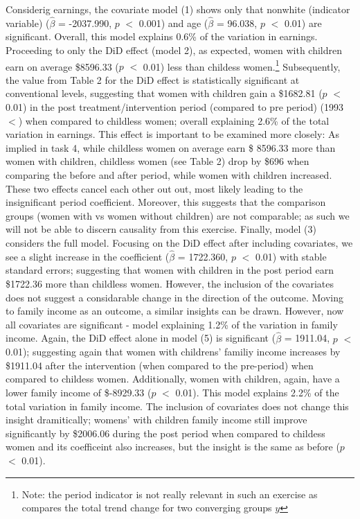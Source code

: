 \documentclass[a4paper]{article}
\begin{document}
\indent Considerig earnings, the covariate model (1) shows only that nonwhite (indicator variable) ($\hat{\beta}$ = -2037.990, $p$ $<$ 0.001) and age ($\hat{\beta}$ = 96.038, $p$ $<$ 0.01) are significant. Overall, this model explains 0.6\% of the variation in earnings. Proceeding to only the DiD effect (model 2), as expected, women with children earn on average \$8596.33 ($p$ $<$ 0.01) less than childess women.\footnote{Note: the period indicator is not really relevant in such an exercise as compares the total trend change for two converging groups $y$} Subsequently, the value from Table 2 for the DiD effect is statistically significant at conventional levels, suggesting that women with children gain a \$1682.81 ($p$ $<$ 0.01) in the post treatment/intervention period (compared to pre period) (1993 $<$) when compared to childless women; overall explaining 2.6\% of the total variation in earnings. This effect is important to be examined more closely: As implied in task 4, while childless women on average earn \$ 8596.33 more than women with children, childless women (see Table 2) drop by \$696 when comparing the before and after period, while women with children increased. These two effects cancel each other out out, most likely leading to the insignificant period coefficient. Moreover, this suggests that the comparison groups (women with vs women without children) are not comparable; as such we will not be able to discern causality from this exercise. Finally, model (3) considers the full model. Focusing on the DiD effect after including covariates, we see a slight increase in the coefficient ($\hat{\beta}$ = 1722.360, $p$ $<$ 0.01) with stable standard errors; suggesting that women with children in the post period earn \$1722.36 more than childless women. However, the inclusion of the covariates does not suggest a considarable change in the direction of the outcome. 
\indent Moving to family income as an outcome, a similar insights can be drawn. However, now all covariates are significant - model explaining 1.2\% of the variation in family income. Again, the DiD effect alone in model (5) is significant ($\hat{\beta}$ = 1911.04, $p$ $<$ 0.01); suggesting again that women with childrens' familiy income increases by \$1911.04 after the intervention (when compared to the pre-period) when compared to childess women. Additionally, women with children, again, have a lower family income of \$-8929.33 ($p$ $<$ 0.01). This model explains 2.2\% of the total variation in family income. The inclusion of covariates does not change this insight dramitically; womens' with children family income still improve significantly by \$2006.06 during the post period when compared to childess women and its coefficeint also increases, but the insight is the same as before ($p$ $<$ 0.01). 
\end{document}
